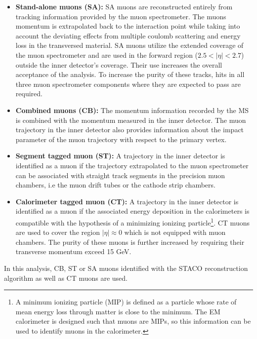 \begin{itemize}
    \item \textbf{Stand-alone muons (SA):} SA muons are reconstructed entirely from
    tracking information provided by the muon spectrometer. The muons momentum
    is extrapolated back to the interaction point while taking into account the
    deviating effects from multiple coulomb scattering and energy loss in the 
    transversed material. SA muons utilize the extended coverage of the muon 
    spectrometer 
    and are used in the forward region ($2.5 < |\eta| < 2.7$) outside the 
    inner detector's coverage. Their use increases the overall acceptance 
    of the analysis. To increase the purity of these tracks, hits
    in all three muon spectrometer components where they are expected to pass
    are required.

    \item \textbf{Combined muons (CB):} The momentum information recorded by
    the MS is combined with the momentum measured in the inner detector. The
    muon trajectory in the inner detector also provides information about the 
    impact parameter of the muon trajectory with respect to the primary vertex.

    \item \textbf{Segment tagged muon (ST):} A trajectory in the inner detector
    is identified as a muon if the trajectory extrapolated to the muon spectrometer
    can be associated with straight track segments in the precision muon chambers,
    i.e the muon drift tubes or the cathode strip chambers.

    \item \textbf{Calorimeter tagged muon (CT):} A trajectory in the inner detector
    is identified as a muon if the associated energy deposition in the calorimeters
    is compatible with the hypothesis of a minimizing ionizing particle\footnote{
    A minimum ionizing particle (MIP) is defined as a particle whose rate 
    of mean energy loss through matter is close to the minimum. 
    The EM calorimeter is designed such that muons are MIPs, so this information
    can be used to identify muons in the calorimeter.}.
    CT muons are used to cover the region
    $|\eta| \approx 0$ which is not equipped with muon chambers. The purity
    of these muons is further increased by requiring their
    transverse momentum exceed 15 GeV.
\end{itemize}
In this analysis, CB, ST or SA muons identified with the STACO reconstruction 
algorithm as well as CT muons are used.

